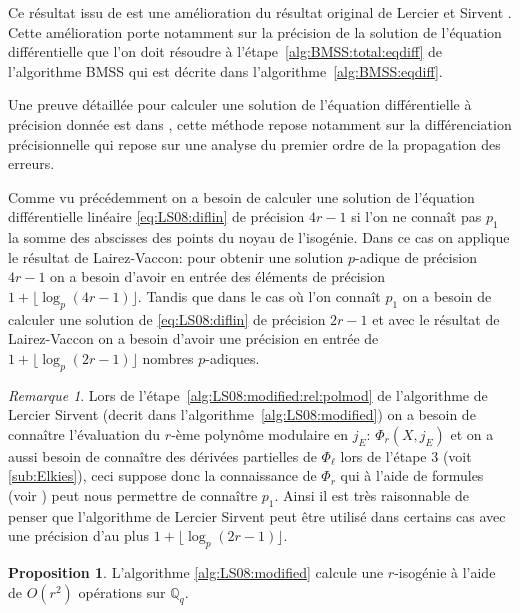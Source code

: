 \documentclass[10pt,a4paper]{book}
\theoremstyle{plain}
\theoremstyle{definition}
\theoremstyle{definition}
\theoremstyle{definition}
\newtheorem{prop}[thm]{Proposition}
\theoremstyle{definition}
\theoremstyle{remark}
\newtheorem{rem}[thm]{Remarque}
\theoremstyle{remark}
\theoremstyle{definition}
\begin{document}
Ce résultat issu de \cite{LairezVaccon16} est une amélioration du résultat original de Lercier et Sirvent \cite{Lercier-Sirvent2008}. Cette amélioration porte notamment sur la précision de la solution de l'équation différentielle que l'on doit résoudre à l'étape~\ref{alg:BMSS:total:eqdiff} de l'algorithme BMSS  qui est décrite dans l'algorithme~\ref{alg:BMSS:eqdiff}.


Une preuve détaillée pour calculer une solution de l'équation différentielle à précision donnée est dans \cite{LairezVaccon16}, cette méthode repose notamment sur la différenciation précisionnelle qui repose sur une analyse du premier ordre de la propagation des erreurs. 

Comme vu précédemment on a besoin de calculer une solution de l'équation différentielle linéaire \eqref{eq:LS08:diflin} de précision $4r-1$ si l'on ne connaît pas $p_1$ la somme des abscisses des points du noyau de l'isogénie. Dans ce cas on applique le résultat de Lairez-Vaccon: pour obtenir une solution $p$-adique de précision $4 r-1$ on a besoin d'avoir en entrée des éléments de précision $ 1 + \lfloor \log_p(4 r - 1) \rfloor $. Tandis que dans le cas où l'on connaît $p_1$ on a besoin de calculer une solution de \eqref{eq:LS08:diflin} de précision $2r - 1$ et avec le résultat de Lairez-Vaccon on a besoin d'avoir une précision en entrée de $ 1 + \lfloor \log_p(2 r - 1) \rfloor $ nombres $p$-adiques.


\begin{rem}
Lors de l'étape~\ref{alg:LS08:modified:rel:polmod} de l'algorithme de Lercier Sirvent (decrit dans l'algorithme~\ref{alg:LS08:modified}) on a besoin de connaître l'évaluation du $r$-ème polynôme modulaire en $j_E$: $\Phi_{r}(X,j_E)$ et on a aussi besoin de connaître des dérivées partielles de $\Phi_{\ell}$ lors de l'étape $3$ (voit \ref{sub:Elkies}), ceci suppose donc la connaissance de $\Phi_{r}$ qui à l'aide de formules (voir \cite[Theoreme 17.22]{ehcc05}) peut nous permettre de connaître $p_1$. Ainsi il est très raisonnable de penser que l'algorithme de Lercier Sirvent peut être utilisé dans certains cas avec une précision d'au plus $1 + \lfloor \log_{p}(2r - 1) \rfloor$.
\end{rem}

\begin{prop}
L'algorithme \ref{alg:LS08:modified} calcule une $r$-isogénie à l'aide de $O(r^2)$  opérations sur $\mathbb{Q}_q$.
\end{prop}
\end{document}
